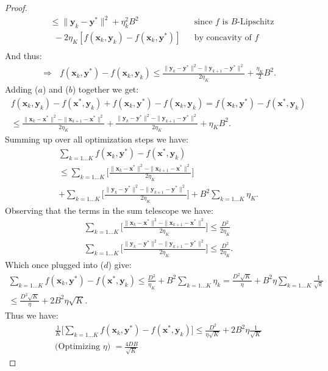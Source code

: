 \begin{proof}
\begin{align*}
        & \leq \| \bm{y}_k - \bm{y}^* \|^2 + \eta_k^2 B^2 && \text{since $f$ is $B$-Lipschitz} \\ & ~ ~ - 2  \eta_K [f(\bm{x}_k,\bm{y}_k)-f(\bm{x}_k,\bm{y}^*)] && \text{by concavity of $f$}\\
    \end{align*}
    And thus:
    \begin{align*}
        \Rightarrow ~~~ f(\bm{x}_k,\bm{y}^*) - f(\bm{x}_k,\bm{y}_k) \leq \frac{  \| \bm{y}_k - \bm{y}^* \|^2 - \| \bm{y}_{k+1}-\bm{y}^* \|^2
        }{2 \eta_K
        } + \frac{\eta_K}{2} B^2. \tag{b}
    \end{align*}
    Adding ($a$) and ($b$) together we get:
    \begin{align*}
        f(\bm{x}_k,\bm{y}_k)-f(\bm{x}^*,\bm{y}_k) + f(\bm{x}_k,\bm{y}^*) - f(\bm{x}_k,\bm{y}_k) = f(\bm{x}_k,\bm{y}^*) -f(\bm{x}^*,\bm{y}_k) \\
        \leq 
        \frac{  \| \bm{x}_k - \bm{x}^* \|^2 - \| \bm{x}_{k+1}-\bm{x}^* \|^2
        }{2 \eta_K} +
        \frac{ \| \bm{y}_k - \bm{y}^* \|^2 - \| \bm{y}_{k+1}-\bm{y}^* \|^2
        }{2 \eta_K} +
        \eta_K B^2. \tag{c}
    \end{align*}
    Summing up over all optimization steps we have:
    \begin{align*}
        \sum_{k=1...K} f(\bm{x}_k,\bm{y}^*) -f(\bm{x}^*,\bm{y}_k) \\
        \leq \sum_{k=1...K} \Bigg[
        \frac{  \| \bm{x}_k - \bm{x}^* \|^2 - \| \bm{x}_{k+1}-\bm{x}^* \|^2
        }{2 \eta_K} \Bigg] \\+ \sum_{k=1...K} \Bigg[
        \frac{ \| \bm{y}_k - \bm{y}^* \|^2 - \| \bm{y}_{k+1}-\bm{y}^* \|^2
        }{2 \eta_K}  \Bigg]  +
        B^2 \sum_{k=1...K}\eta_K. \tag{d}
    \end{align*}
    Observing that the terms in the sum telescope we have:
    \begin{align*}
        \sum_{k=1...K} \Bigg[ \frac{  \| \bm{x}_k - \bm{x}^* \|^2 - \| \bm{x}_{k+1}-\bm{x}^* \|^2
        }{2 \eta_K} \Bigg]  \leq \frac{D^2}{2 \eta_K} \\
        \sum_{k=1...K} \Bigg[
        \frac{ \| \bm{y}_k - \bm{y}^* \|^2 - \| \bm{y}_{k+1}-\bm{y}^* \|^2
        }{2 \eta_K}  \Bigg] \leq \frac{D^2}{2 \eta_K}.
    \end{align*}
    Which once plugged into ($d$) give:
    \begin{align*}
        \sum_{k=1...K} f(\bm{x}_k,\bm{y}^*) -f(\bm{x}^*,\bm{y}_k) \leq 
        \frac{D^2}{\eta_K} + B^2 \sum_{k=1...K}\eta_k = \frac{D^2 \sqrt{K}}{\eta} + B^2 \eta \sum_{k=1...K}\frac{1}{\sqrt{k}} \\
        \leq  \frac{D^2 \sqrt{K}}{\eta} +2 B^2 \eta \sqrt{K}.
    \end{align*}
    Thus we have:
    \begin{align*}
        \frac{1}{K} \Big[ \sum_{k=1...K} f(\bm{x}_k,\bm{y}^*) -f(\bm{x}^*,\bm{y}_k)  \Big] \leq \frac{D^2 }{ \eta \sqrt{K}} +  2 B^2 \eta \frac{1}{\sqrt{K}}  \\
        \text{(Optimizing $\eta$) } = \frac{4DB}{\sqrt{K}} 
    \end{align*}
\end{proof}

